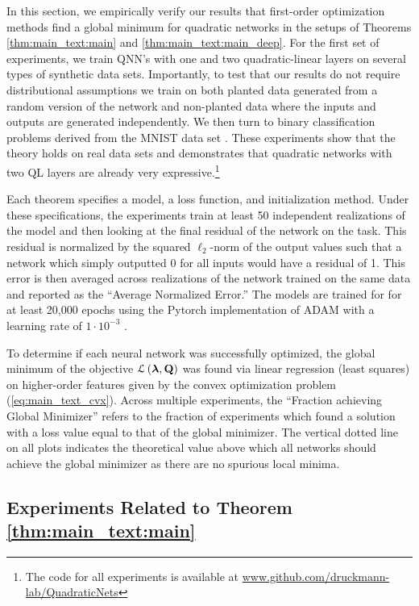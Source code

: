 \documentclass[11pt]{article}
\theoremstyle{plain}
\DeclareMathOperator*{\llq}{\ensuremath{\mathcal{L} \left(\V{\lambda},\Mx{Q}\right)} }
\theoremstyle{plain}
\numberwithin{equation}{section}
\numberwithin{lemma}{section}
\numberwithin{theorem}{section}
\numberwithin{corollary}{section}
\numberwithin{observation}{section}
\numberwithin{definition}{section}
\numberwithin{example}{section}
\begin{document}
In this section, we empirically verify our results that first-order optimization methods find a global minimum for quadratic networks in the setups of Theorems \ref{thm:main_text:main} and \ref{thm:main_text:main_deep}.  For the first set of experiments, we train QNN's with one and two quadratic-linear layers on several types of synthetic data sets. Importantly, to test that our results do not require distributional assumptions we train on both planted data generated from a random version of the network and non-planted data where the inputs and outputs are generated independently. We then turn to binary classification problems derived from the MNIST data set \cite{lecun2010mnist}.  These experiments show that the theory holds on real data sets and demonstrates that quadratic networks with two QL layers are already very expressive.\footnote{The code for all experiments is available at \url{www.github.com/druckmann-lab/QuadraticNets}}



Each theorem specifies a model, a loss function, and initialization method.  Under these specifications, the experiments train at least 50 independent realizations of the model and then looking at the final residual of the network on the task. This residual is normalized by the squared $\ell_2$-norm of the output values such that a network which simply outputted 0 for all inputs would have a residual of 1.  This error is then averaged across realizations of the network trained on the same data and reported as the ``Average Normalized Error.'' The models are trained for for at least 20,000 epochs using the Pytorch implementation of ADAM with a learning rate of $1\cdot 10^{-3}$ \cite{paszke2017automatic, kingma2014adam}.



To determine if each neural network was successfully optimized, the global minimum of the objective $\llq$ was found via linear regression (least squares) on higher-order features given by the convex optimization problem (\ref{eq:main_text_cvx}).  Across multiple experiments, the ``Fraction achieving Global Minimizer'' refers to the fraction of experiments which found a solution with a loss value equal to that of the global minimizer.  The vertical dotted line on all plots indicates the theoretical value above which all networks should achieve the global minimizer as there are no spurious local minima.




\subsection{Experiments Related to Theorem \ref{thm:main_text:main}} 
\end{document}
